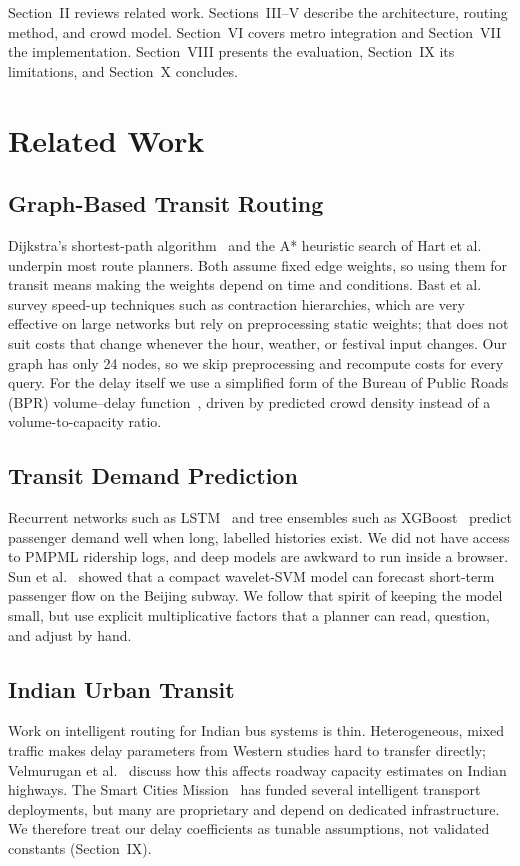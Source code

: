 \documentclass[conference]{IEEEtran}
\begin{document}
Section~II reviews related work. Sections~III--V describe the architecture, routing method, and crowd model. Section~VI covers metro integration and Section~VII the implementation. Section~VIII presents the evaluation, Section~IX its limitations, and Section~X concludes.

\section{Related Work}

\subsection{Graph-Based Transit Routing}
Dijkstra's shortest-path algorithm~\cite{dijkstra1959} and the A* heuristic search of Hart et al.~\cite{hart1968} underpin most route planners. Both assume fixed edge weights, so using them for transit means making the weights depend on time and conditions. Bast et al.~\cite{bast2016} survey speed-up techniques such as contraction hierarchies, which are very effective on large networks but rely on preprocessing static weights; that does not suit costs that change whenever the hour, weather, or festival input changes. Our graph has only 24 nodes, so we skip preprocessing and recompute costs for every query. For the delay itself we use a simplified form of the Bureau of Public Roads (BPR) volume--delay function~\cite{bpr1964}, driven by predicted crowd density instead of a volume-to-capacity ratio.

\subsection{Transit Demand Prediction}
Recurrent networks such as LSTM~\cite{hochreiter1997} and tree ensembles such as XGBoost~\cite{chen2016} predict passenger demand well when long, labelled histories exist. We did not have access to PMPML ridership logs, and deep models are awkward to run inside a browser. Sun et al.~\cite{sun2015} showed that a compact wavelet-SVM model can forecast short-term passenger flow on the Beijing subway. We follow that spirit of keeping the model small, but use explicit multiplicative factors that a planner can read, question, and adjust by hand.

\subsection{Indian Urban Transit}
Work on intelligent routing for Indian bus systems is thin. Heterogeneous, mixed traffic makes delay parameters from Western studies hard to transfer directly; Velmurugan et al.~\cite{velmurugan2010} discuss how this affects roadway capacity estimates on Indian highways. The Smart Cities Mission~\cite{smartcities2023} has funded several intelligent transport deployments, but many are proprietary and depend on dedicated infrastructure. We therefore treat our delay coefficients as tunable assumptions, not validated constants (Section~IX).
\end{document}
